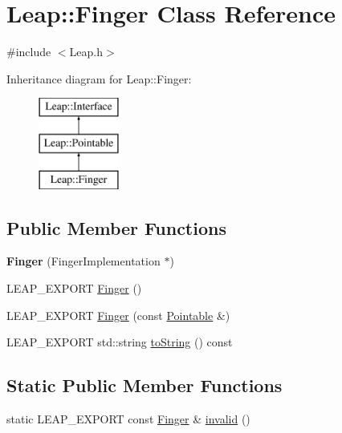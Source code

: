 \hypertarget{class_leap_1_1_finger}{\section{Leap\+:\+:Finger Class Reference}
\label{class_leap_1_1_finger}
}


{\ttfamily \#include $<$Leap.\+h$>$}

Inheritance diagram for Leap\+:\+:Finger\+:\begin{figure}[H]
\begin{center}
\leavevmode
\includegraphics[height=3.000000cm]{class_leap_1_1_finger}
\end{center}
\end{figure}
\subsection*{Public Member Functions}
\begin{DoxyCompactItemize}
\item 
\hypertarget{class_leap_1_1_finger_ac393e4d718a2163fabd65b85d5c09267}{{\bfseries Finger} (Finger\+Implementation $\ast$)}\label{class_leap_1_1_finger_ac393e4d718a2163fabd65b85d5c09267}

\item 
L\+E\+A\+P\+\_\+\+E\+X\+P\+O\+R\+T \hyperlink{class_leap_1_1_finger_aed76c909a2904029d313538e01604c88}{Finger} ()
\item 
L\+E\+A\+P\+\_\+\+E\+X\+P\+O\+R\+T \hyperlink{class_leap_1_1_finger_a864d7de003b2d5b6d738c67da322e702}{Finger} (const \hyperlink{class_leap_1_1_pointable}{Pointable} \&)
\item 
L\+E\+A\+P\+\_\+\+E\+X\+P\+O\+R\+T std\+::string \hyperlink{class_leap_1_1_finger_a2641934432be97ad3c33c8dbe287a7b9}{to\+String} () const 
\end{DoxyCompactItemize}
\subsection*{Static Public Member Functions}
\begin{DoxyCompactItemize}
\item 
static L\+E\+A\+P\+\_\+\+E\+X\+P\+O\+R\+T const \hyperlink{class_leap_1_1_finger}{Finger} \& \hyperlink{class_leap_1_1_finger_a2dec17262f38e1bb548da99086c5e8e3}{invalid} ()
\end{DoxyCompactItemize}
